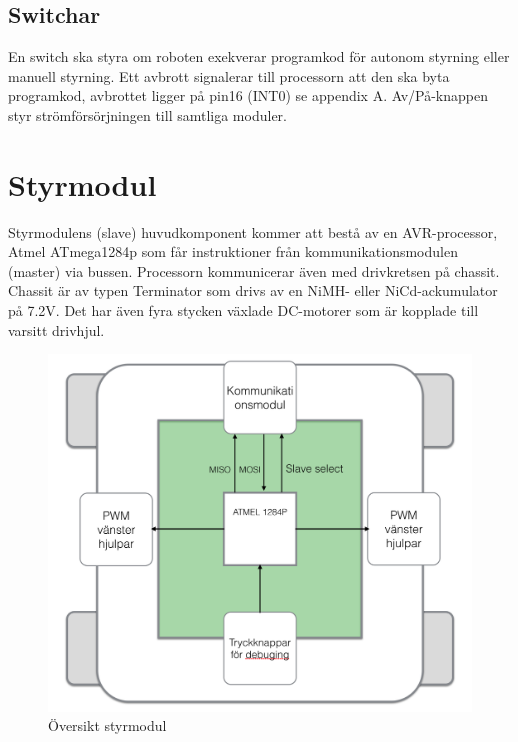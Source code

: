 \documentclass[a4paper,12pt,fleqn]{article}
\begin{document}
\subsection{Switchar}
En switch ska styra om roboten exekverar programkod för autonom styrning eller manuell styrning. Ett avbrott signalerar till processorn att den ska byta programkod, avbrottet ligger på pin16 (INT0) se appendix A. 
Av/På-knappen styr strömförsörjningen till samtliga moduler. 


\newpage
\section{Styrmodul}
Styrmodulens (slave) huvudkomponent kommer  att bestå av en AVR-processor, Atmel ATmega1284p som får instruktioner från kommunikationsmodulen (master) via bussen. Processorn kommunicerar även med drivkretsen på chassit. Chassit är av typen Terminator som drivs av en NiMH- eller NiCd-ackumulator på 7.2V. Det har även fyra stycken växlade DC-motorer som är kopplade till varsitt drivhjul. 

\begin{figure}[htp] %
  \begin{center}
  \includegraphics[keepaspectratio=true,scale=0.5]{styrmodul}  %
  \end{center}
  \caption{Översikt styrmodul} %
  \label{fig:styr} %
\end{figure}
\newpage
\end{document}
